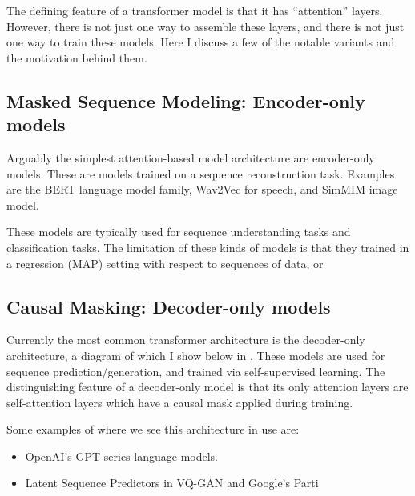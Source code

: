 The defining feature of a transformer model is that it has ``attention'' layers. However, there is not just one way to assemble these layers, and there is not just one way to train these models. Here I discuss a few of the notable variants and the motivation behind them.

\subsection{Masked Sequence Modeling: Encoder-only models}
\label{ss:msm}

Arguably the simplest attention-based model architecture are encoder-only models. These are models trained on a sequence reconstruction task. Examples are the BERT \cite{bert} language model family, Wav2Vec \cite{wav2vec} for speech, and SimMIM \cite{sim-mim} image model.

These models are typically used for sequence understanding tasks and classification tasks. The limitation of these kinds of models is that they  trained in a regression (MAP) setting with respect to sequences of data, or




\subsection{Causal Masking: Decoder-only models}
\label{ss:decoder-only}


Currently the most common transformer architecture is the decoder-only architecture, a diagram of which I show below in . These models are used for sequence prediction/generation, and trained via self-supervised learning. The distinguishing feature of a decoder-only model is that its only attention layers are self-attention layers which have a causal mask applied during training.

Some examples of where we see this architecture in use are:
\begin{itemize}
    \item OpenAI's GPT-series \cite{gpt1, gpt2, gpt3} language models.
    \item Latent Sequence Predictors in VQ-GAN \cite{vqgan} and Google's Parti \cite{parti}
\end{itemize}




